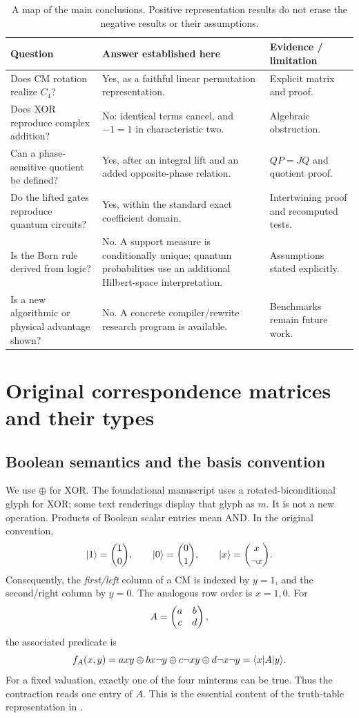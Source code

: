 \begin{table}[htbp]
\centering\small
\begin{tabularx}{\textwidth}{@{}L{0.25\textwidth}Y L{0.23\textwidth}@{}}
\toprule
Question & Answer established here & Evidence / limitation\\
\midrule
Does CM rotation realize $C_4$? & Yes, as a faithful linear permutation representation. & Explicit matrix and proof.\\
Does XOR reproduce complex addition? & No: identical terms cancel, and $-1=1$ in characteristic two. & Algebraic obstruction.\\
Can a phase-sensitive quotient be defined? & Yes, after an integral lift and an added opposite-phase relation. & $QP=JQ$ and quotient proof.\\
Do the lifted gates reproduce quantum circuits? & Yes, within the standard exact coefficient domain. & Intertwining proof and recomputed tests.\\
Is the Born rule derived from logic? & No. A support measure is conditionally unique; quantum probabilities use an additional Hilbert-space interpretation. & Assumptions stated explicitly.\\
Is a new algorithmic or physical advantage shown? & No. A concrete compiler/rewrite research program is available. & Benchmarks remain future work.\\
\bottomrule
\end{tabularx}
\caption{A map of the main conclusions. Positive representation results do not erase the negative results or their assumptions.}
\end{table}

\section{Original correspondence matrices and their types}\label{sec:foundations}
\subsection{Boolean semantics and the basis convention}
We use $\oplus$ for XOR. The foundational manuscript uses a rotated-biconditional glyph for XOR; some text renderings display that glyph as $m$. It is not a new operation. Products of Boolean scalar entries mean AND. In the original convention,
\begin{equation}
 \lvert 1\rangle=\binom10,\qquad \lvert 0\rangle=\binom01,\qquad
 \lvert x\rangle=\binom{x}{\neg x}.
\end{equation}
Consequently, the \emph{first/left} column of a CM is indexed by $y=1$, and the second/right column by $y=0$. The analogous row order is $x=1,0$. For
\begin{equation}
 A=\begin{pmatrix}a&b\\c&d\end{pmatrix},
\end{equation}
the associated predicate is
\begin{equation}\label{eq:predicate}
 f_A(x,y)=a xy\oplus b x\neg y\oplus c\neg x y\oplus d\neg x\neg y
          =\langle x\rvert A\lvert y\rangle.
\end{equation}
For a fixed valuation, exactly one of the four minterms can be true. Thus the contraction reads one entry of $A$. This is the essential content of the truth-table representation in \cite[Sections 2.2--3]{droncheff}.

